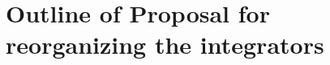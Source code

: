 \documentclass[11pt,a4paper,twoside]{article}
\begin{document}
%
\newcommand\T{\rule{0pt}{2.6ex}}         %
\newcommand\B{\rule[-1.2ex]{0pt}{0pt}}   %
\newcommand{\Ts}{\rule{0pt}{2.4ex}}      %

\newcommand{\captspace}{\vspace{2mm}}

\setlength{\textwidth}{15cm}
\setlength{\oddsidemargin}{9.6mm}  %
\setlength{\evensidemargin}{-0.4mm} %
\setlength{\topmargin}{-4.4mm} %
\setlength{\textheight}{22cm}

\renewcommand{\textfraction}{0.0}
\newcommand{\qtw}{3.75cm}  %
\newcommand{\ttw}{4.33cm}  %
\newcommand{\htw}{7.5cm}  %
\newcommand{\ntw}{13cm} %
\newcommand{\gmxmajor}{@MANUAL_MAJOR_VERSION@}
\newcommand{\gmxver}{@MANUAL_VERSION@}
\newcommand{\figref}[1]{Fig.~\ref{fig:#1}}
\newcommand{\figsref}[2]{Figs.~\ref{fig:#1} and ~\ref{fig:#2}}
\newcommand{\tabref}[1]{Table~\ref{tab:#1}}
\newcommand{\eqnref}[1]{eqn.~\ref{eqn:#1}}
\newcommand{\eqnsref}[2]{eqns.~\ref{eqn:#1} and \ref{eqn:#2}}
\newcommand{\secref}[1]{sec.~\ref{sec:#1}}
\newcommand{\tsecref}[1]{\ref{sec:#1}}
\newcommand{\ssecref}[1]{\ref{subsec:#1}}
\newcommand{\sssecref}[1]{\ref{subsubsec:#1}}
\newcommand{\chref}[1]{chapter~\ref{ch:#1}}
\newcommand{\appref}[1]{Appendix~\ref{app:#1}}
\newcommand{\wwwpage}{\href{http://www.gromacs.org}{www.gromacs.org}}
\newcommand{\email}{\href{mailto:gromacs@gromacs.org}{gromacs@gromacs.org}}
\newcommand{\mcc}[2]{\multicolumn{#1}{c|}{#2}}
\newcommand{\mcl}[2]{\multicolumn{#1}{l}{#2}}
\setlength{\headwidth}{\textwidth}
\setlength{\headheight}{1.0cm}

\section{Outline of Proposal for reorganizing the integrators}
\end{document}
